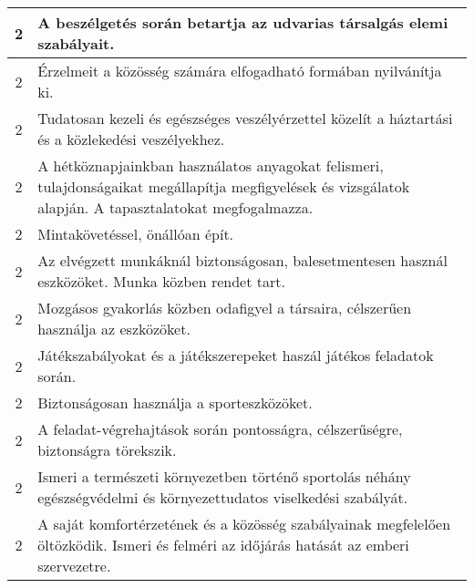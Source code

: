 \begin{longtable}{c | p{12cm} }
                                
                                          2 &  A beszélgetés során betartja az udvarias társalgás elemi szabályait. \\ \hline
                                          2 &  Érzelmeit a közösség számára elfogadható formában nyilvánítja ki. \\ \hline
                                          2 &  Tudatosan kezeli és egészséges veszélyérzettel közelít a háztartási és a közlekedési veszélyekhez. \\ \hline
                                          2 &  A hétköznapjainkban használatos anyagokat felismeri, tulajdonságaikat megállapítja megfigyelések és vizsgálatok alapján. A tapasztalatokat megfogalmazza. \\ \hline
                                          2 &  Mintakövetéssel, önállóan épít. \\ \hline
                                          2 &  Az elvégzett munkáknál biztonságosan, balesetmentesen használ eszközöket. Munka közben rendet tart. \\ \hline
                                          2 &  Mozgásos gyakorlás közben odafigyel a társaira, célszerűen használja az eszközöket. \\ \hline
                                          2 &  Játékszabályokat és a játékszerepeket haszál játékos feladatok során. \\ \hline
                                          2 &  Biztonságosan használja a sporteszközöket. \\ \hline
                                          2 &  A feladat-végrehajtások során pontosságra, célszerűségre, biztonságra törekszik. \\ \hline
                                          2 &  Ismeri a természeti környezetben történő sportolás néhány egészségvédelmi és környezettudatos viselkedési szabályát. \\ \hline
                                          2 &  A saját komfortérzetének és a közösség szabályainak megfelelően öltözködik. Ismeri és felméri az időjárás hatását az emberi szervezetre. \\ \hline
                                      

\end{longtable}
